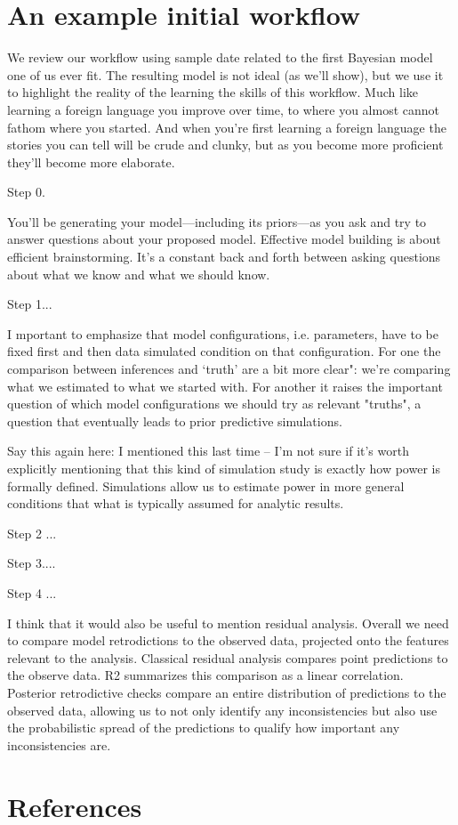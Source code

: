 \documentclass[11pt]{article}
\begin{document}
\section{An example initial workflow}

We review our workflow using sample date related to the first Bayesian model one of us ever fit. The resulting model is not ideal (as we'll show), but we use it to highlight the reality of the learning the skills of this workflow. Much like learning a foreign language you improve over time, to where you almost cannot fathom where you started. And when you're first learning a foreign language the stories you can tell will be crude and  clunky, but as you become more proficient they'll become more elaborate.


Step 0.

You’ll be generating your model---including its priors---as you ask and try to answer questions about your proposed model. Effective model building is about efficient brainstorming.  It's a constant back and forth between asking
questions about what we know and what we should know.

Step 1... 

I mportant to emphasize that model configurations,
i.e. parameters, have to be fixed first and then data simulated condition on that configuration.  For one the comparison
between inferences and `truth' are a bit more clear": we're comparing what we estimated to what we started with.  For
another it raises the important question of which model configurations we should try as relevant "truths", a question that
eventually leads to prior predictive simulations.

Say this again here: I mentioned this last time -- I'm not sure if it's worth explicitly mentioning that this kind of simulation study is
exactly how power is formally defined.  Simulations allow us to estimate power in more general conditions that what is
typically assumed for analytic results.

Step 2 ...

Step 3....

Step 4 ...

I think that it would also be useful to mention residual analysis. Overall we need to compare model retrodictions to the observed data, projected onto the features relevant to the analysis. Classical residual analysis compares point predictions to the observe data. R2 summarizes this comparison as a linear correlation. Posterior retrodictive checks compare an entire distribution of predictions to the observed data, allowing us to not only identify any inconsistencies but also use the probabilistic spread of the predictions to qualify how important any inconsistencies are.



\section{References}
\vspace{-5ex}

\end{document}
